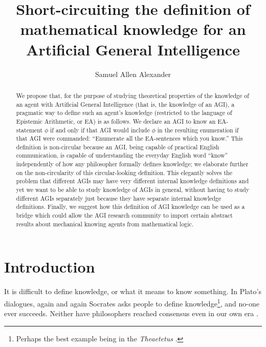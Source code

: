 \documentclass[runningheads]{llncs}
\begin{document}
\title{Short-circuiting the definition of mathematical knowledge for an
Artificial General Intelligence
}


\author{Samuel Allen
Alexander}



\maketitle

\begin{abstract}
We propose that, for the purpose of studying theoretical properties of
the knowledge of an agent with Artificial General Intelligence (that is, 
the knowledge of an AGI),
a pragmatic way to define such an agent's knowledge (restricted to the language
of Epistemic Arithmetic, or EA) is as follows.
We declare an AGI to know an EA-statement $\phi$
if and only if that AGI would include $\phi$ in the resulting
enumeration if that AGI were commanded:
``Enumerate all the EA-sentences which you know.''
This definition is non-circular because an AGI, being capable of
practical English communication, is capable of understanding the everyday
English word ``know'' independently of how any philosopher formally
defines knowledge; we elaborate further on the non-circularity of this
circular-looking definition.
This elegantly solves the problem that different AGIs may have
very different internal knowledge definitions and yet we want
to be able to study knowledge of AGIs in general, without having
to study different AGIs separately just because they have separate
internal knowledge definitions. Finally, we suggest how this
definition of AGI knowledge can be used as a bridge which could
allow the AGI research community to import certain abstract results
about mechanical knowing agents from mathematical logic.
\end{abstract}

\section{Introduction}

It is difficult to define knowledge, or what it means to know something.
In Plato's dialogues, again and again Socrates asks people to define
knowledge\footnote{Perhaps the best example being in the \emph{Theaetetus}
\cite{theaetetus}.}, and no-one ever succeeds. Neither have philosophers
reached consensus even in our own era \cite{sep-knowledge-analysis}.
\end{document}
